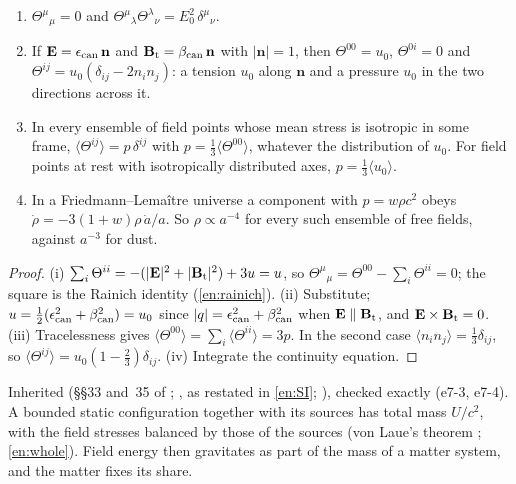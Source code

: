 \begin{proposition}
\label{e7:prop:stress}
\begin{enumerate}[label=(\roman*),leftmargin=2.2em]
\item $\Theta^\mu{}_\mu=0$ and $\Theta^\mu{}_\lambda \Theta^\lambda{}_\nu=E_0^2\,\delta^\mu{}_\nu$.
\item If $\mathbf E=\epsilon_{\rm can}\,\mathbf n$ and $\mathbf B_{\rm t}=\beta_{\rm can}\,\mathbf n$ with $|\mathbf n|=1$, then $\Theta^{00}=u_0$, $\Theta^{0i}=0$ and $\Theta^{ij}=u_0(\delta_{ij}-2n_in_j)$:
a tension $u_0$ along $\mathbf n$ and a pressure $u_0$ in the two directions across it.
\item In every ensemble of field points whose mean stress is isotropic in some frame, $\langle \Theta^{ij}\rangle=p\,\delta^{ij}$ with
$p=\tfrac13\langle \Theta^{00}\rangle$, whatever the distribution of $u_0$. For field points at rest with isotropically distributed axes,
$p=\tfrac13\langle u_0\rangle$.
\item In a Friedmann--Lema\^itre universe a component with $p=w\rho c^2$ obeys $\dot\rho=-3(1+w)\rho\,\dot a/a$. So $\rho\propto a^{-4}$ for every
such ensemble of free fields, against $a^{-3}$ for dust.
\end{enumerate}
\end{proposition}

\begin{proof}
(i) $\sum_i\Theta^{ii}=-(|\mathbf E|^2+|\mathbf B_{\rm t}|^2)+3u=u$, so $\Theta^\mu{}_\mu=\Theta^{00}-\sum_i\Theta^{ii}=0$; the square is the Rainich identity (\cref{en:rainich}). (ii) Substitute; $u=\tfrac12(\epsilon_{\rm can}^2+\beta_{\rm can}^2)=u_0$ since $|q|=\epsilon_{\rm can}^2+\beta_{\rm can}^2$ when $\mathbf E\parallel\mathbf B_{\rm t}$, and $\mathbf E\times\mathbf B_{\rm t}=0$.
(iii) Tracelessness gives $\langle \Theta^{00}\rangle=\sum_i\langle \Theta^{ii}\rangle=3p$. In the second case $\langle n_in_j\rangle=\tfrac13\delta_{ij}$, so
$\langle \Theta^{ij}\rangle=u_0(1-\tfrac23)\delta_{ij}$. (iv) Integrate the continuity equation.
\end{proof}

Inherited (\S\S33 and~35 of \cite{LandauLifshitz2}; \cite{Rainich1925}, as restated in \cref{en:SI}; \cite{WeinbergCosmo08}), checked exactly (e7-3, e7-4). A
bounded static configuration together with its sources has total mass $U/c^2$, with the field stresses balanced by those of the sources (von Laue's
theorem \cite{Laue1911}; \cref{en:whole}). Field energy then gravitates as part of the mass of a matter system, and the matter fixes
its share.

